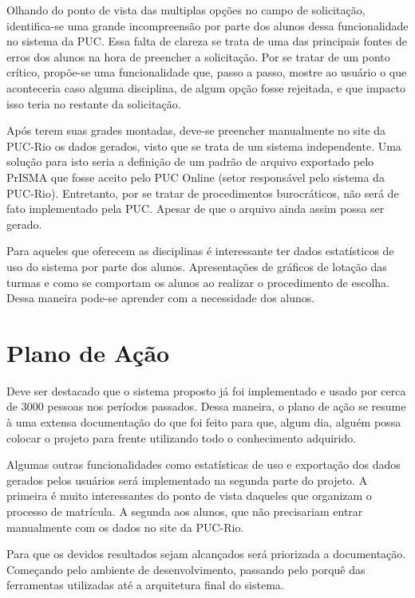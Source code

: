 \documentclass[graduacao,brazil]{ThesisPUC}
\begin{document}
Olhando do ponto de vista das multiplas opções no campo de solicitação, identifica-se uma grande incompreensão por parte dos alunos dessa funcionalidade no sistema da PUC. Essa falta de clareza se trata de uma das principais fontes de erros dos alunos na hora de preencher a solicitação. Por se tratar de um ponto crítico, propõe-se uma funcionalidade que, passo a passo, mostre ao usuário o que aconteceria caso alguma disciplina, de algum opção fosse rejeitada, e que impacto isso teria no restante da solicitação.

Após terem suas grades montadas, deve-se preencher manualmente no site da PUC-Rio os dados gerados, visto que se trata de um sistema independente. Uma solução para isto seria a definição de um padrão de arquivo exportado pelo PrISMA que fosse aceito pelo PUC Online (setor responsável pelo sistema da PUC-Rio). Entretanto, por se tratar de procedimentos burocráticos, não será de fato implementado pela PUC. Apesar de que o arquivo ainda assim possa ser gerado.

Para aqueles que oferecem as disciplinas é interessante ter dados estatísticos de uso do sistema por parte dos alunos. Apresentações de gráficos de lotação das turmas e como se comportam os alunos ao realizar o procedimento de escolha. Dessa maneira pode-se aprender com a necessidade dos alunos.


\chapter{Plano de A\c{c}\~ao}

Deve ser destacado que o sistema proposto já foi implementado e usado por cerca de 3000 pessoas nos períodos passados. Dessa maneira, o plano de ação se resume à uma extensa documentação do que foi feito para que, algum dia, alguém possa colocar o projeto para frente utilizando todo o conhecimento adquirido.

Algumas outras funcionalidades como estatísticas de uso e exportação dos dados gerados pelos usuários será implementado na segunda parte do projeto. A primeira é muito interessantes do ponto de vista daqueles que organizam o processo de matrícula. A segunda aos alunos, que não precisariam entrar manualmente com os dados no site da PUC-Rio.

Para que os devidos resultados sejam alcançados será priorizada a documentação. Começando pelo ambiente de desenvolvimento, passando pelo porquê das ferramentas utilizadas até a arquitetura final do sistema.
\end{document}
